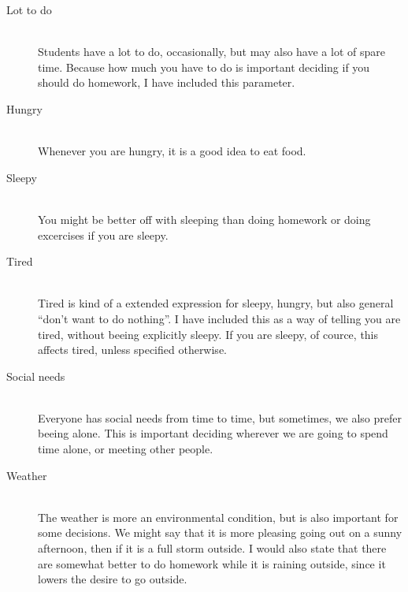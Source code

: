 \begin{description}
\item[Lot to do] \hfill \\
Students have a lot to do, occasionally, but may also have a
lot of spare time.
Because how much you have to do is important deciding if you should do homework,
I have included this parameter.

\item[Hungry] \hfill \\
Whenever you are hungry, it is a good idea to eat food.

\item[Sleepy] \hfill \\
You might be better off with sleeping than doing homework or doing excercises if
you are sleepy.

\item[Tired] \hfill \\
Tired is kind of a extended expression for sleepy, hungry, but also
general ``don't want to do nothing''. I have included this as a way of telling you are
tired, without beeing explicitly sleepy. If you are sleepy, of cource, this
affects tired, unless specified otherwise.

\item[Social needs] \hfill \\
Everyone has social needs from time to time, but sometimes, we also prefer
beeing alone. This is important deciding wherever we are going to spend time
alone, or meeting other people.

\item[Weather] \hfill \\
The weather is more an environmental condition, but is also
important for some decisions. We might say that it is more pleasing going out on a sunny
afternoon, then if it is a full storm outside. I would also state that there are
somewhat better to do homework while it is raining outside, since it lowers the
desire to go outside.

\end{description}

